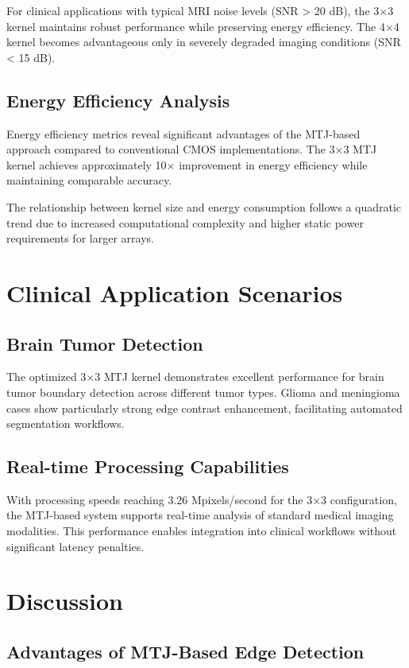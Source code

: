 \documentclass[conference]{IEEEtran}
\begin{document}
For clinical applications with typical MRI noise levels (SNR > 20 dB), the 3×3 kernel maintains robust performance while preserving energy efficiency. The 4×4 kernel becomes advantageous only in severely degraded imaging conditions (SNR < 15 dB).

\subsection{Energy Efficiency Analysis}

Energy efficiency metrics reveal significant advantages of the MTJ-based approach compared to conventional CMOS implementations. The 3×3 MTJ kernel achieves approximately 10× improvement in energy efficiency while maintaining comparable accuracy.

The relationship between kernel size and energy consumption follows a quadratic trend due to increased computational complexity and higher static power requirements for larger arrays.

\section{Clinical Application Scenarios}

\subsection{Brain Tumor Detection}

The optimized 3×3 MTJ kernel demonstrates excellent performance for brain tumor boundary detection across different tumor types. Glioma and meningioma cases show particularly strong edge contrast enhancement, facilitating automated segmentation workflows.

\subsection{Real-time Processing Capabilities}

With processing speeds reaching 3.26 Mpixels/second for the 3×3 configuration, the MTJ-based system supports real-time analysis of standard medical imaging modalities. This performance enables integration into clinical workflows without significant latency penalties.

\section{Discussion}

\subsection{Advantages of MTJ-Based Edge Detection}
\end{document}

